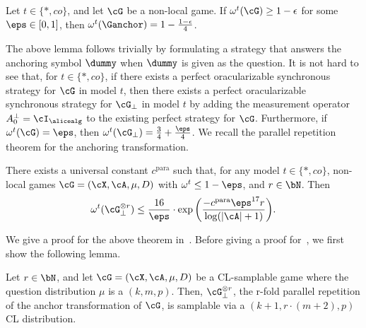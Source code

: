 \begin{lemma}
	Let $t \in \{*, co\}$, and let $\cG$ be a non-local game. If $\omega^{t} (\cG) \geq 1- \epsilon$ for some $\eps \in [0,1]$, then $\omega^{t} (\Ganchor) = 1- \frac{1 - \epsilon}{4}$.  
\end{lemma}
The above lemma follows trivially by formulating a strategy that answers the anchoring symbol $\dummy$ when $\dummy$ is given as the question. It is not hard to see that, for $t \in \{*,co\}$, if there exists a perfect oracularizable synchronous strategy for $\cG$ in model $t$, then there exists a perfect oracularizable synchronous strategy for $\cG_{\bot}$ in model $t$ by adding the measurement operator $A^{\bot}_{0} = \cI_{\alicealg}$ to the existing perfect strategy for $\cG$. Furthermore, if $\omega^{t}(\cG) = \eps$, then $\omega^{t}(\cG_{\bot}) = \frac{3}{4} + \frac{\eps}{4}$. We recall the parallel repetition theorem for the anchoring transformation.
\begin{theorem} \label{thm:anchoringparallelrep}
	There exists a universal constant $c^{\text{para}}$ such that, for any model $t \in \{*,co\}$, non-local games $\cG = (\cX, \cA, \mu, D)$ with $\omega^{t} \leq 1 - \eps$, and $r \in \bN$. Then
	\begin{equation} \label{eq:mainparallel}
		\omega^{t}(\cG_{\bot}^{\otimes r}) \leq \frac{16}{\eps} \cdot \exp{\left(\frac{- c^{\text{para}} \eps^{17} r }{\log(|\cA | + 1)}\right)}.
	\end{equation}
\end{theorem}
We give a proof for the above theorem in~. Before giving a proof for~, we first show the following lemma. 

\begin{lemma} \label{lem:anchortrans}
	Let $r \in \bN$, and let $\cG = (\cX, \cA, \mu, D)$ be a CL-samplable game where the question distribution $\mu$ is a $(k,m,p)$. Then, $\cG^{\otimes r}_{\bot}$, the r-fold parallel repetition of the anchor transformation of $\cG$, is samplable via a $(k+1,r \cdot (m+2),p)$ CL distribution. 
\end{lemma}

